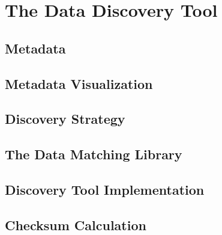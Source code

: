\chapter{The Data Discovery Tool}\label{ch:ch2label}


\section{Metadata}



\section{Metadata Visualization}



\section{Discovery Strategy}



\section{The Data Matching Library}



\section{Discovery Tool Implementation}



\section{Checksum Calculation}


